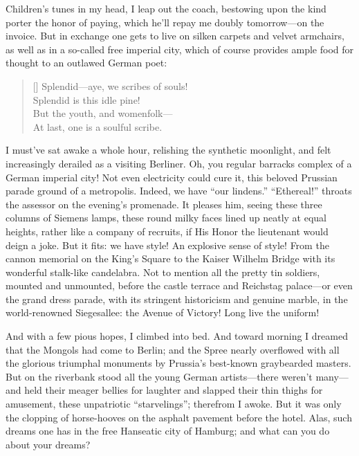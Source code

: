 \documentclass[12pt,a4paper]{article}
\begin{document}
Children’s tunes in my head, I leap out the coach, bestowing upon the kind porter the honor of paying, which he’ll repay me doubly tomorrow—on the invoice. But in exchange one gets to live on silken carpets and velvet armchairs, as well as in a so-called free imperial city, which of course provides ample food for thought to an outlawed German poet:
\settowidth{\versewidth}{Splendid—aye, we scribes of souls!}
\begin{verse}[\versewidth]
Splendid—aye, we scribes of souls! \\
Splendid is this idle pine! \\
But the youth, and womenfolk— \\
At last, one is a soulful scribe.
\end{verse}

I must’ve sat awake a whole hour, relishing the synthetic moonlight, and felt increasingly derailed as a visiting Berliner. Oh, you regular barracks complex of a German imperial city! Not even electricity could cure it, this beloved Prussian parade ground of a metropolis. Indeed, we have “our lindens.” “Ethereal!” throats the assessor on the evening’s promenade. It pleases him, seeing these three columns of Siemens lamps, these round milky faces lined up neatly at equal heights, rather like a company of recruits, if His Honor the lieutenant would deign a joke. But it fits: we have style! An explosive sense of style! From the cannon memorial on the King’s Square to the Kaiser Wilhelm Bridge with its wonderful stalk-like candelabra. Not to mention all the pretty tin soldiers, mounted and unmounted, before the castle terrace and Reichstag palace—or even the grand dress parade, with its stringent historicism and genuine marble, in the world-renowned Siegesallee: the Avenue of Victory! Long live the uniform!

And with a few pious hopes, I climbed into bed. And toward morning I dreamed that the Mongols had come to Berlin; and the Spree nearly overflowed with all the glorious triumphal monuments by Prussia’s best-known graybearded masters. But on the riverbank stood all the young German artists—there weren’t many—and held their meager bellies for laughter and slapped their thin thighs for amusement, these unpatriotic “starvelings”; therefrom I awoke. But it was only the clopping of horse-hooves on the asphalt pavement before the hotel. Alas, such dreams one has in the free Hanseatic city of Hamburg; and what can you do about your dreams?
\end{document}
